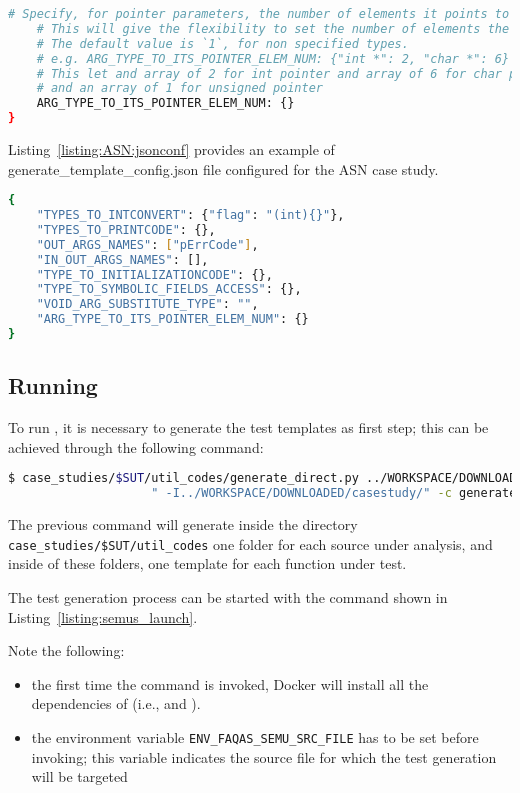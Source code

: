 \begin{lstlisting}[language=bash,label=listing:json:conf,caption=generate\_template\_config.json file.]
    # Specify, for pointer parameters, the number of elements it points to (must be > 0)
    # This will give the flexibility to set the number of elements the pointer points to.
    # The default value is `1`, for non specified types.
    # e.g. ARG_TYPE_TO_ITS_POINTER_ELEM_NUM: {"int *": 2, "char *": 6}
    # This let and array of 2 for int pointer and array of 6 for char pointer, 
    # and an array of 1 for unsigned pointer
    ARG_TYPE_TO_ITS_POINTER_ELEM_NUM: {}
}
\end{lstlisting}

Listing~\ref{listing:ASN:jsonconf} provides an example of generate\_template\_config.json file configured for the ASN case study.

\begin{lstlisting}[language=bash,label=listing:ASN:jsonconf,caption=generate\_template\_config.json file for ASN case study.]
{
    "TYPES_TO_INTCONVERT": {"flag": "(int){}"},
    "TYPES_TO_PRINTCODE": {},
    "OUT_ARGS_NAMES": ["pErrCode"],
    "IN_OUT_ARGS_NAMES": [],
    "TYPE_TO_INITIALIZATIONCODE": {},
    "TYPE_TO_SYMBOLIC_FIELDS_ACCESS": {},
    "VOID_ARG_SUBSTITUTE_TYPE": "",
    "ARG_TYPE_TO_ITS_POINTER_ELEM_NUM": {}
}
\end{lstlisting}

\subsection{Running \SEMUS}
\label{sec:semuslaunch}

To run \SEMUS, it is necessary to generate the test templates as first step; this can be achieved through the following command:

\begin{lstlisting}[language=bash]
 $ case_studies/$SUT/util_codes/generate_direct.py ../WORKSPACE/DOWNLOADED/casestudy/test.c direct \
                    " -I../WORKSPACE/DOWNLOADED/casestudy/" -c generate_template_config.json

\end{lstlisting}

The previous command will generate inside the directory \texttt{case\_studies/\$SUT/util\_codes} one folder for each source under analysis, and inside of these folders, one template for each function under test.

The test generation process can be started with the command shown in Listing~\ref{listing:semus_launch}. 

Note the following:
\begin{itemize}
	\item the first time the command is invoked, Docker will install all the dependencies of \SEMUS (i.e., \SEMU and \MASS).
	\item the environment variable \texttt{ENV\_FAQAS\_SEMU\_SRC\_FILE} has to be set before invoking; this variable indicates the source file for which the test generation will be targeted
\end{itemize}

